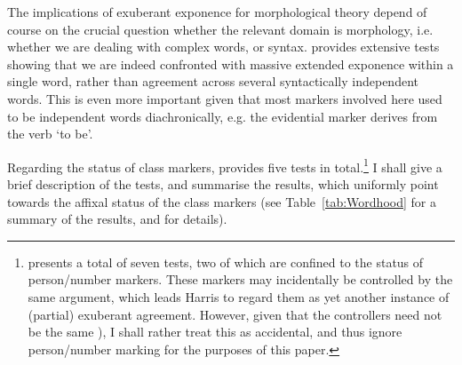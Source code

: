 \documentclass[output=paper]{langsci/langscibook}
\begin{document}
The implications of exuberant exponence for morphological theory
depend of course on the crucial question whether the relevant domain
is morphology, i.e. whether we are dealing with complex words, or
syntax. \citet{Harris09} provides extensive tests showing that we are
indeed confronted with massive extended exponence within a single
word, rather than agreement across several syntactically independent
words. This is even more important given that most markers involved
here used to be independent words diachronically, e.g. the evidential
marker derives from the verb `to be'. %

Regarding the status of class markers, \citet{Harris09} provides five
tests in total.\footnote{\citet{Harris09} presents a
  total of seven tests, two of which are confined to the status of
  person/number markers. These markers may incidentally be controlled
  by the same argument, which leads Harris to regard them as yet
  another instance of (partial) exuberant agreement. However, given
  that the controllers need not be the same
  \citep[see][ex. (33)]{Harris09}), I shall rather treat this as
  accidental, and thus ignore person/number marking for the
  purposes of this paper.} I shall give a brief description of the
tests, and summarise the results, which uniformly point towards the
affixal status of the class markers (see Table~\ref{tab:Wordhood} for
a summary of the results, and
\citealt[sec.~5]{Harris09} for details).
\end{document}
